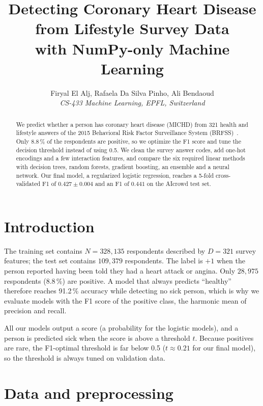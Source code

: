 \documentclass[10pt,conference,compsocconf,onecolumn]{IEEEtran}
\begin{document}
\title{Detecting Coronary Heart Disease from Lifestyle Survey Data\\with NumPy-only Machine Learning}

\author{
  Firyal El Alj, Rafaela Da Silva Pinho, Ali Bendaoud\\
  \textit{CS-433 Machine Learning, EPFL, Switzerland}
}

\maketitle

\begin{abstract}
We predict whether a person has coronary heart disease (MICHD) from 321
health and lifestyle answers of the 2015 Behavioral Risk Factor
Surveillance System (BRFSS)~\cite{brfss}. Only 8.8\,\% of the respondents are positive,
so we optimize the F1 score and tune the decision threshold instead of
using 0.5. We clean the survey answer codes, add one-hot encodings and a
few interaction features, and compare the six required linear methods with
decision trees, random forests, gradient boosting, an ensemble and a neural
network. Our final model, a regularized
logistic regression, reaches a 5-fold cross-validated F1 of
$0.427 \pm 0.004$ and an F1 of $0.441$ on the AIcrowd test set.
\end{abstract}

\section{Introduction}

The training set contains $N = 328{,}135$ respondents described by
$D = 321$ survey features; the test set contains $109{,}379$ respondents. The label is $+1$ when
the person reported having been told they had a heart attack or angina.
Only $28{,}975$ respondents (8.8\,\%) are positive. A model that always
predicts ``healthy'' therefore reaches 91.2\,\% accuracy while detecting no
sick person, which is why we evaluate models with the F1 score of the
positive class, the harmonic mean of precision and recall.

All our models output a score (a probability for the logistic models), and
a person is predicted sick when the score is above a threshold $t$. Because
positives are rare, the F1-optimal threshold is far below 0.5
($t \approx 0.21$ for our final model), so the threshold is always tuned on
validation data.

\section{Data and preprocessing}
\label{sec:data}
\end{document}
